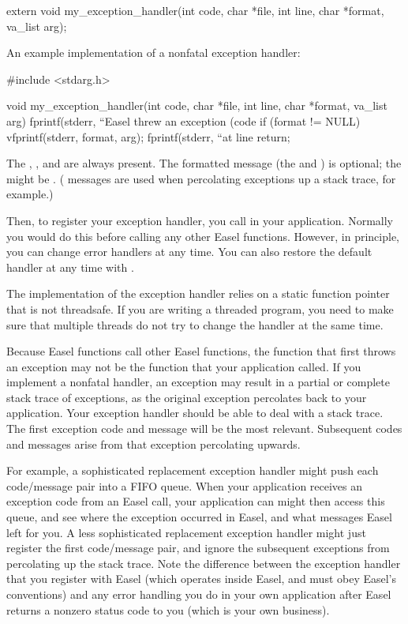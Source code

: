 \begin{cchunk}
extern void my_exception_handler(int code, char *file, int line, char *format, va_list arg);
\end{cchunk}

An example implementation of a nonfatal exception handler:

\begin{cchunk}
#include <stdarg.h>

void
my_exception_handler(int code, char *file, int line, char *format, va_list arg)
{
  fprintf(stderr, ``Easel threw an exception (code %
  if (format != NULL) vfprintf(stderr, format, arg);
  fprintf(stderr, ``at line %
  return;
}
\end{cchunk}

The , , and  are always
present. The formatted message (the  and ) is optional; the  might be
. ( messages are used when percolating
exceptions up a stack trace, for example.)

Then, to register your exception handler, you call
 in your
application. Normally you would do this before calling any other Easel
functions. However, in principle, you can change error handlers at any
time. You can also restore the default handler at any time with
.

The implementation of the exception handler relies on a static
function pointer that is not threadsafe. If you are writing a threaded
program, you need to make sure that multiple threads do not try to
change the handler at the same time.

Because Easel functions call other Easel functions, the function that
first throws an exception may not be the function that your
application called.  If you implement a nonfatal handler, an exception
may result in a partial or complete stack trace of exceptions, as the
original exception percolates back to your application. Your exception
handler should be able to deal with a stack trace. The first exception
code and message will be the most relevant. Subsequent codes and
messages arise from that exception percolating upwards. 

For example, a sophisticated replacement exception handler might push
each code/message pair into a FIFO queue. When your application
receives an exception code from an Easel call, your application can
might then access this queue, and see where the exception occurred in
Easel, and what messages Easel left for you. A less sophisticated
replacement exception handler might just register the first
code/message pair, and ignore the subsequent exceptions from
percolating up the stack trace. Note the difference between the
exception handler that you register with Easel (which operates inside
Easel, and must obey Easel's conventions) and any error handling you
do in your own application after Easel returns a nonzero status code
to you (which is your own business).

